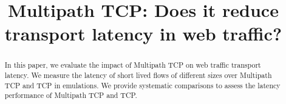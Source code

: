 \documentclass[conference,a4paper]{IEEEtran}
\theoremstyle{definition}
\newcommand{\per}[1]{\textcolor{orange}{{\sf PH: #1}}}
\begin{document}
\title{Multipath TCP: Does it reduce transport latency in web traffic?}

\author{
}

\maketitle


\begin{abstract}
In this paper, we evaluate the impact of Multipath TCP on web traffic transport latency.
We measure the latency of short lived flows of different sizes over Multipath TCP and TCP 
in emulations. We provide systematic comparisons to assess the latency performance of Multipath TCP
and TCP.

\end{abstract}














\end{document}
